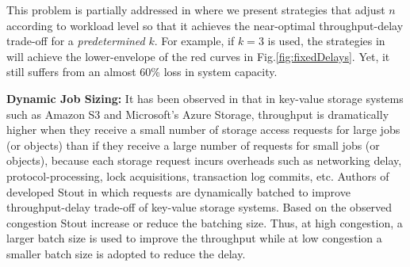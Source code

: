 \documentclass[journal]{IEEEtran}
\begin{document}
This problem is partially addressed in \cite{fastcloud} where we present strategies that adjust $n$ according to workload level so that it achieves the near-optimal throughput-delay trade-off for a {\em predetermined} $k$. For example, if $k=3$ is used, the strategies in \cite{fastcloud} will achieve the lower-envelope of the red curves in Fig.\ref{fig:fixedDelays}. Yet, it still suffers from an almost 60\% loss in system capacity.


{\bf Dynamic Job Sizing:}
It has been observed in \cite{Garfinkel07anevaluation, stout} that in key-value storage systems such as Amazon S3 and Microsoft's Azure Storage, throughput is dramatically higher when they receive a small number of storage access requests for large jobs (or objects) than if they receive a large number of requests for small jobs (or objects), because each storage request incurs overheads such as networking delay, protocol-processing, lock acquisitions, transaction log commits, etc. Authors of \cite{stout} developed Stout in which requests are dynamically batched to improve throughput-delay trade-off of key-value storage systems. Based on the observed congestion Stout increase or reduce the batching size. Thus, at high congestion, a larger batch size is used to improve the throughput while at low congestion a smaller batch size is adopted to reduce the delay.
\end{document}
